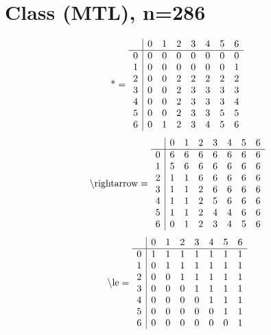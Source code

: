 \documentclass[11pt]{article}
\begin{document}
\section{Class (MTL), n=286}
\[\text{*} = 
\begin{array}{r | r r r r r r r}
 & 0 & 1 & 2 & 3 & 4 & 5 & 6 \\ \hline
0 & 0 & 0 & 0 & 0 & 0 & 0 & 0 \\
1 & 0 & 0 & 0 & 0 & 0 & 0 & 1 \\
2 & 0 & 0 & 2 & 2 & 2 & 2 & 2 \\
3 & 0 & 0 & 2 & 3 & 3 & 3 & 3 \\
4 & 0 & 0 & 2 & 3 & 3 & 3 & 4 \\
5 & 0 & 0 & 2 & 3 & 3 & 5 & 5 \\
6 & 0 & 1 & 2 & 3 & 4 & 5 & 6 \\
\end{array}
\]
\[\text{\textbackslash rightarrow} = 
\begin{array}{r | r r r r r r r}
 & 0 & 1 & 2 & 3 & 4 & 5 & 6 \\ \hline
0 & 6 & 6 & 6 & 6 & 6 & 6 & 6 \\
1 & 5 & 6 & 6 & 6 & 6 & 6 & 6 \\
2 & 1 & 1 & 6 & 6 & 6 & 6 & 6 \\
3 & 1 & 1 & 2 & 6 & 6 & 6 & 6 \\
4 & 1 & 1 & 2 & 5 & 6 & 6 & 6 \\
5 & 1 & 1 & 2 & 4 & 4 & 6 & 6 \\
6 & 0 & 1 & 2 & 3 & 4 & 5 & 6 \\
\end{array}
\]
\[\text{\textbackslash le} = 
\begin{array}{r | r r r r r r r}
 & 0 & 1 & 2 & 3 & 4 & 5 & 6 \\ \hline
0 & 1 & 1 & 1 & 1 & 1 & 1 & 1 \\
1 & 0 & 1 & 1 & 1 & 1 & 1 & 1 \\
2 & 0 & 0 & 1 & 1 & 1 & 1 & 1 \\
3 & 0 & 0 & 0 & 1 & 1 & 1 & 1 \\
4 & 0 & 0 & 0 & 0 & 1 & 1 & 1 \\
5 & 0 & 0 & 0 & 0 & 0 & 1 & 1 \\
6 & 0 & 0 & 0 & 0 & 0 & 0 & 1 \\
\end{array}
\]
\end{document}
